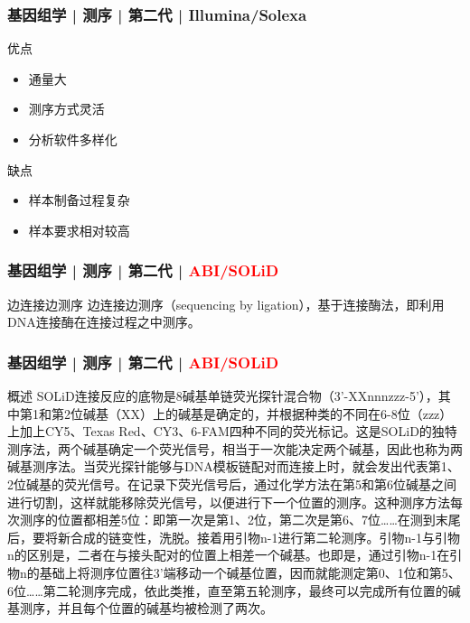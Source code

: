 \begin{frame}
  \frametitle{基因组学 | 测序 | 第二代 | Illumina/Solexa}
  \begin{block}{优点}
    \begin{itemize}
      \item 通量大
      \item 测序方式灵活
      \item 分析软件多样化
    \end{itemize}
  \end{block}
  \pause
  \begin{block}{缺点}
    \begin{itemize}
      \item 样本制备过程复杂
      \item 样本要求相对较高
    \end{itemize}
  \end{block}
\end{frame}

\begin{frame}
  \frametitle{基因组学 | 测序 | 第二代 | \textcolor{red}{ABI/SOLiD}}
  \begin{block}{边连接边测序}
边连接边测序（sequencing by ligation），基于连接酶法，即利用DNA连接酶在连接过程之中测序。  
  \end{block}
\end{frame}

\begin{frame}
  \frametitle{基因组学 | 测序 | 第二代 | \textcolor{red}{ABI/SOLiD}}
  \begin{block}{概述}
SOLiD连接反应的底物是8碱基单链荧光探针混合物（3'-XXnnnzzz-5'），其中第1和第2位碱基（XX）上的碱基是确定的，并根据种类的不同在6-8位（zzz）上加上CY5、Texas Red、CY3、6-FAM四种不同的荧光标记。这是SOLiD的独特测序法，两个碱基确定一个荧光信号，相当于一次能决定两个碱基，因此也称为两碱基测序法。当荧光探针能够与DNA模板链配对而连接上时，就会发出代表第1、2位碱基的荧光信号。在记录下荧光信号后，通过化学方法在第5和第6位碱基之间进行切割，这样就能移除荧光信号，以便进行下一个位置的测序。这种测序方法每次测序的位置都相差5位：即第一次是第1、2位，第二次是第6、7位……在测到末尾后，要将新合成的链变性，洗脱。接着用引物n-1进行第二轮测序。引物n-1与引物n的区别是，二者在与接头配对的位置上相差一个碱基。也即是，通过引物n-1在引物n的基础上将测序位置往3'端移动一个碱基位置，因而就能测定第0、1位和第5、6位……第二轮测序完成，依此类推，直至第五轮测序，最终可以完成所有位置的碱基测序，并且每个位置的碱基均被检测了两次。
  \end{block}
\end{frame}


